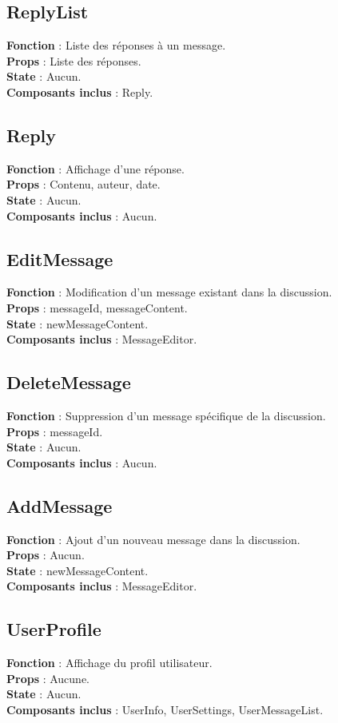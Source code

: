\documentclass{article}
\begin{document}
\subsection*{ReplyList}
\textbf{Fonction} : Liste des réponses à un message.\\
\textbf{Props} : Liste des réponses.\\
\textbf{State} : Aucun.\\
\textbf{Composants inclus} : Reply.

\subsection*{Reply}
\textbf{Fonction} : Affichage d'une réponse.\\
\textbf{Props} : Contenu, auteur, date.\\
\textbf{State} : Aucun.\\
\textbf{Composants inclus} : Aucun.

\subsection*{EditMessage}
\textbf{Fonction} : Modification d'un message existant dans la discussion.\\
\textbf{Props} : messageId, messageContent.\\
\textbf{State} : newMessageContent.\\
\textbf{Composants inclus} : MessageEditor.

\subsection*{DeleteMessage}
\textbf{Fonction} : Suppression d'un message spécifique de la discussion.\\
\textbf{Props} : messageId.\\
\textbf{State} : Aucun.\\
\textbf{Composants inclus} : Aucun.

\subsection*{AddMessage}
\textbf{Fonction} : Ajout d'un nouveau message dans la discussion.\\
\textbf{Props} : Aucun.\\
\textbf{State} : newMessageContent.\\
\textbf{Composants inclus} : MessageEditor.

\subsection*{UserProfile}
\textbf{Fonction} : Affichage du profil utilisateur.\\
\textbf{Props} : Aucune.\\
\textbf{State} : Aucun.\\
\textbf{Composants inclus} : UserInfo, UserSettings, UserMessageList.
\end{document}
